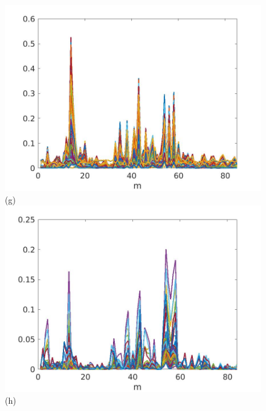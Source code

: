 \documentclass[journal]{IEEEtran}
\begin{document}
\begin{figure}[htp!]
\includegraphics[scale=.12]{../../figs/perc01_J3_VH_sqrdif_change_locations}(g)
\includegraphics[scale=.12]{../../figs/perc01_consecdif_J3_VH_sqrdif_change_locations}(h)


\end{figure}
\end{document}
